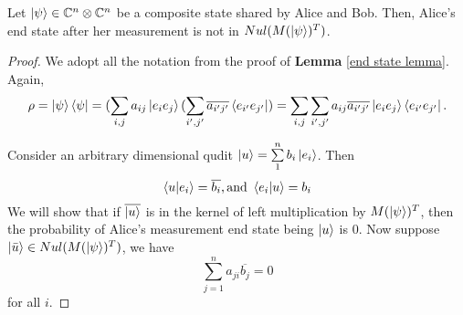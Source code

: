 \begin{prop} \label{null space}
Let $\ket{\psi} \in \mathbb{C}^n \otimes \mathbb{C}^n$ be a composite state shared by Alice and Bob.  Then, Alice's end state after her measurement is not in $Nul(M(\ket{\psi})^T)$.
\end{prop}
\begin{proof}
We adopt all the notation from the proof of {\bf{Lemma}} \ref{end state lemma}.  Again, 
\begin{gather*}
\rho=\ket{\psi}\bra{\psi}=(\sum_{i,j} a_{ij}\ket{e_i e_j}(\sum_{i',j'} \overline{a_{i'j'}}\bra{e_{i'} e_{j'}})=\sum_{i,j} \sum_{i',j'} a_{ij} \overline{a_{i'j'}}\ket{e_i e_j}\bra{e_{i'} e_{j'}}.  
\end{gather*}

Consider an arbitrary dimensional qudit $\ket{u}=\sum\limits_1^n b_i \ket{e_i}$. Then
\begin{equation} \label{eqn: null space eqn 1}
    \braket{u|e_i}=\overline{b_i}, \textrm{and }\braket{e_i|u}=b_i
\end{equation}
We will show that if $\overline{\ket{u}}$ is in the kernel of left multiplication by $M(\ket{\psi})^T$, then the probability of Alice's measurement end state being $\ket{u}$ is $0$. Now suppose
$\ket{\Bar{u}} \in Nul(M(\ket{\psi})^T)$, we have \begin{equation} \label{eqn: null space eqn 2}
\sum_{j=1}^n a_{ji} \overline{b_j}=0
\end{equation}
for all $i$.






\end{proof}
